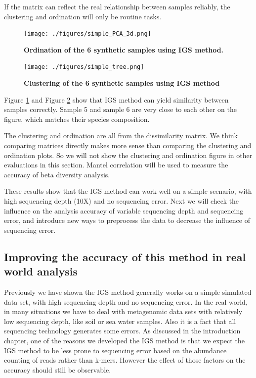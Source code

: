 If the matrix can reflect the real 
relationship between samples reliably, the clustering and ordination
will only be routine tasks.


\begin{figure}[!ht]
 \centerline{\texttt{[image: ./figures/simple\_PCA\_3d.png]}}
\caption{\bf Ordination of the 6 synthetic samples using IGS method.}
\label{fig:simple_pcoa}
\end{figure}


\begin{figure}[!ht]
 \centerline{\texttt{[image: ./figures/simple\_tree.png]}}
\caption{\bf Clustering of the 6 synthetic samples using IGS method}
\label{fig:simple_cluster}
\end{figure}



Figure \ref{fig:simple_pcoa} and Figure \ref{fig:simple_cluster} show that 
IGS method can yield similarity between samples correctly. Sample 5 and sample 6 are very 
close to each other on the figure, which 
matches their species composition.

The clustering and ordination are all from the dissimilarity matrix. 
We think comparing matrices directly makes more sense than comparing the 
clustering and ordination plots. So we will not show the clustering and 
ordination figure in other evaluations in this section. Mantel correlation will 
be used to measure the accuracy of beta diversity analysis.


These results show that the IGS method can work well on a simple
scenario, with high sequencing depth (10X) and no sequencing error. Next 
we will check the influence on the analysis accuracy of variable sequencing 
depth and sequencing error, and introduce new ways to preprocess the data 
to decrease the influence of sequencing error. 



\subsection{Improving the accuracy of this method in real world analysis}


Previously we have shown the IGS method generally works on a simple simulated
 data set, with high sequencing depth and no sequencing error. In the real world,
in many situations we have to deal with metagenomic data sets with 
relatively low sequencing depth, like soil or sea water samples. 
Also it is a fact that all sequencing technology generates some errors. As 
discussed in the introduction 
chapter, one of the reasons we developed the IGS method is that 
we expect the IGS method to be less prone to
sequencing error based on the 
abundance counting of reads rather than k-mers. However the effect of those factors 
on the accuracy should still be observable.

